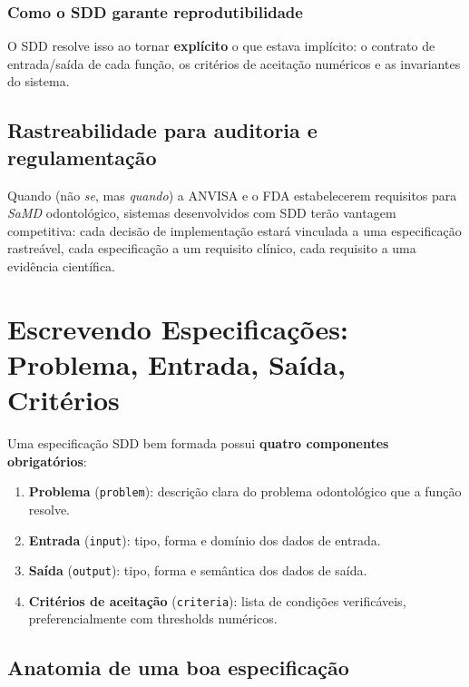 
\subsubsection{Como o SDD garante reprodutibilidade}

O SDD resolve isso ao tornar \textbf{explícito} o que estava implícito:
o contrato de entrada/saída de cada função, os critérios de aceitação
numéricos e as invariantes do sistema.

\subsection{Rastreabilidade para auditoria e regulamentação}

Quando (não \textit{se}, mas \textit{quando}) a ANVISA e o FDA
estabelecerem requisitos para \textit{SaMD} odontológico, sistemas
desenvolvidos com SDD terão vantagem competitiva: cada decisão de
implementação estará vinculada a uma especificação rastreável, cada
especificação a um requisito clínico, cada requisito a uma evidência
científica.

\section{Escrevendo Especificações: Problema, Entrada, Saída, Critérios}

Uma especificação SDD bem formada possui \textbf{quatro componentes
obrigatórios}:

\begin{enumerate}
  \item \textbf{Problema} (\texttt{problem}): descrição clara do problema
    odontológico que a função resolve.
  \item \textbf{Entrada} (\texttt{input}): tipo, forma e domínio dos
    dados de entrada.
  \item \textbf{Saída} (\texttt{output}): tipo, forma e semântica dos
    dados de saída.
  \item \textbf{Critérios de aceitação} (\texttt{criteria}): lista de
    condições verificáveis, preferencialmente com thresholds numéricos.
\end{enumerate}

\subsection{Anatomia de uma boa especificação}

